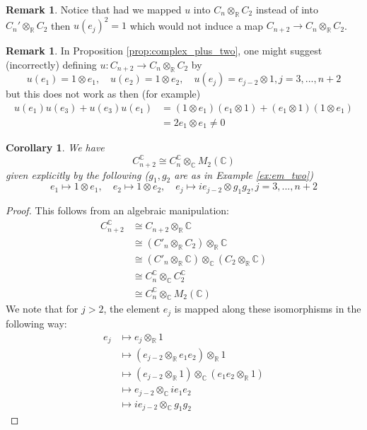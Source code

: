 \documentclass[12pt]{article}
\theoremstyle{plain}
\newtheorem{cor}[thm]{Corollary}
\theoremstyle{definition}
\newtheorem{remark}[thm]{Remark}
\newcommand{\bb}[1]{\mathbb{#1}}
\newcommand{\lto}{\longrightarrow}
\begin{document}
\begin{remark}
	Notice that had we mapped $u$ into $C_n \otimes_{\bb{R}} C_2$ instead of into $C_n' \otimes_{\bb{R}}C_2$ then $u(e_{j})^2 = 1$ which would not induce a map $C_{n+2} \lto C_n \otimes_{\bb{R}}C_2$.
	\end{remark}
\begin{remark}
	In Proposition \ref{prop:complex_plus_two}, one might suggest (incorrectly) defining $u: C_{n+2} \lto C_n \otimes_{\bb{R}}C_2$ by
	\begin{equation}
		u(e_1) = 1 \otimes e_1,\quad u(e_2) = 1 \otimes e_2,\quad u(e_j) = e_{j-2} \otimes 1, j = 3,...,n+2
	\end{equation}
	but this does not work as then (for example)
	\begin{align*}
		u(e_1)u(e_3) + u(e_3)u(e_1) &= (1 \otimes e_1)(e_1 \otimes 1) + (e_1 \otimes 1)(1 \otimes e_1)\\
		&= 2e_1 \otimes e_1 \neq 0
	\end{align*}
\end{remark}
\begin{cor}
	We have
	\begin{equation}
		C_{n+2}^{\bb{C}} \cong C_n^{\bb{C}} \otimes_{\bb{C}}M_2(\bb{C})
	\end{equation}
	given explicitly by the following ($g_1,g_2$ are as in Example \ref{ex:em_two})
	\begin{equation}
		e_1 \longmapsto 1 \otimes e_1,\quad e_2 \longmapsto 1 \otimes e_2,\quad e_j \longmapsto ie_{j-2} \otimes g_1g_2, j = 3,...,n+2
	\end{equation}
\end{cor}
\begin{proof}
	This follows from an algebraic manipulation:
	\begin{align*}
		C_{n+2}^{\bb{C}} &\cong C_{n+2} \otimes_{\bb{R}}\bb{C}\\
		&\cong (C'_n \otimes_{\bb{R}} C_2) \otimes_{\bb{R}}\bb{C}\\
		&\cong (C'_{n}\otimes_{\bb{R}}\bb{C}) \otimes_{\bb{C}} (C_2 \otimes_{\bb{R}} \bb{C})\\
		&\cong C_{n}^{\bb{C}} \otimes_{\bb{C}}C_2^{\bb{C}}\\
		&\cong C_{n}^{\bb{C}} \otimes_{\bb{C}}M_2(\bb{C})
	\end{align*}
	We note that for $j > 2$, the element $e_j$ is mapped along these isomorphisms in the following way:
	\begin{align}
		e_j &\longmapsto e_j \otimes_{\bb{R}} 1\\
		&\longmapsto (e_{j-2} \otimes_{\bb{R}} e_1e_2) \otimes_{\bb{R}} 1\\
		&\longmapsto (e_{j-2} \otimes_{\bb{R}} 1) \otimes_{\bb{C}} (e_1e_2 \otimes_{\bb{R}} 1)\\
		&\label{eq:factor_of_i}\longmapsto e_{j-2} \otimes_{\bb{C}} ie_1e_2\\
		&\longmapsto ie_{j-2} \otimes_{\bb{C}} g_1g_2
	\end{align}
\end{proof}
\end{document}
